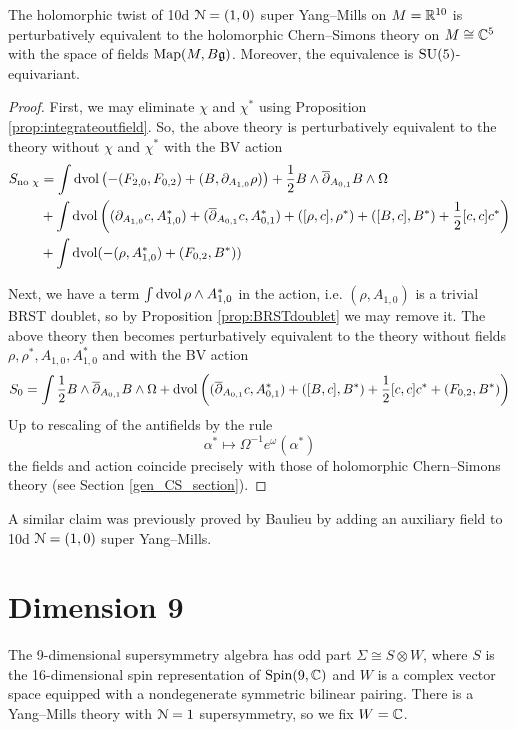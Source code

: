 \documentclass[10pt, oneside]{article}
\begin{document}
\begin{theorem}
The holomorphic twist of 10d $\mathcal{N}=(1, 0)$ super Yang--Mills on $M=\mathbb R^{10}$ is perturbatively equivalent to the holomorphic Chern--Simons theory on $M\cong\mathbb C^5$ with the space of fields $\operatorname{Map}(M, B\mathfrak{g})$. Moreover, the equivalence is $\mathrm{SU}(5)$-equivariant.
\label{thm:10dholomorphictwist}
\end{theorem}
\begin{proof}
First, we may eliminate $\chi$ and $\chi^*$ using Proposition \ref{prop:integrateoutfield}. So, the above theory is perturbatively equivalent to the theory without $\chi$ and $\chi^*$ with the BV action
\begin{align*}
S_{\text{no }\chi} &= \int \operatorname{dvol} \left(-(F_{2, 0}, F_{0, 2}) + (B, \partial_{A_{1, 0}} \rho)\right)  + \frac{1}{2}B\wedge \overline{\partial}_{A_{0, 1}} B\wedge\Omega \\
&+ \int \operatorname{dvol}\left((\partial_{A_{1, 0}} c, A_{1, 0}^*) + (\overline{\partial}_{A_{0, 1}} c, A_{0, 1}^*) + ([\rho, c], \rho^*) + ([B, c], B^*) + \frac{1}{2}[c, c]c^*\right) \\
&+ \int \operatorname{dvol}(-(\rho, A_{1, 0}^*) + (F_{0, 2}, B^*))
\end{align*}

Next, we have a term $\int \operatorname{dvol} \rho\wedge A_{1, 0}^*$ in the action, i.e. $(\rho, A_{1, 0})$ is a trivial BRST doublet, so by Proposition \ref{prop:BRSTdoublet} we may remove it. The above theory then becomes perturbatively equivalent to the theory without fields $\rho,\rho^*,A_{1,0},A_{1,0}^*$ and with the BV action
\[
S_0 = \int \frac{1}{2}B\wedge \overline{\partial}_{A_{0, 1}} B\wedge\Omega + \operatorname{dvol}\left((\overline{\partial}_{A_{0, 1}} c, A_{0, 1}^*) + ([B, c], B^*) + \frac{1}{2}[c, c]c^* + (F_{0, 2}, B^*)\right)
\]
Up to rescaling of the antifields by the rule
\[
\alpha^* \mapsto \Omega^{-1} e^{\omega} (\alpha^*)
\]
the fields and action coincide precisely with those of holomorphic Chern--Simons theory (see Section \ref{gen_CS_section}).
\end{proof}

\begin{remark}
A similar claim was previously proved by Baulieu \cite{Baulieu} by adding an auxiliary field to 10d $\mathcal{N}=(1, 0)$ super Yang--Mills.
\end{remark}

\section{Dimension 9} \label{9d_section}

The 9-dimensional supersymmetry algebra has odd part $\Sigma\cong S\otimes W$, where $S$ is the 16-dimensional spin representation of $\mathrm{Spin}(9, \mathbb C)$ and $W$ is a complex vector space equipped with a nondegenerate symmetric bilinear pairing. There is a Yang--Mills theory with $\mathcal{N}=1$ supersymmetry, so we fix $W = \mathbb C$.
\end{document}
